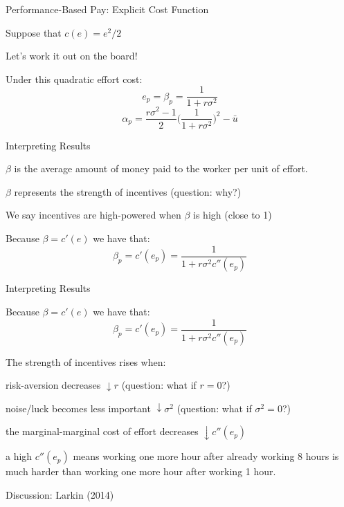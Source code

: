 \documentclass[aspectratio=169,usenames,dvipsnames]{beamer}
\newenvironment{wideitemize}{\itemize\addtolength{\itemsep}{10pt}}{\enditemize}
\begin{document}
\begin{frame}{Performance-Based Pay: Explicit Cost Function}
    \begin{wideitemize}
        \item Suppose that $c(e)=e^2/2$
        \item Let's work it out on the board!
        \pause
        \item Under this quadratic effort cost:
        \[e_p =\beta_p = \frac{1}{1+r \sigma^2}  \]
        \[\alpha_p =  \frac{r \sigma^2-1}{2} \bigg ( \frac{1}{1+r \sigma^2} \bigg )^2-\bar u \]
    \end{wideitemize}
\end{frame}

\begin{frame}{Interpreting Results}
    \begin{wideitemize}
        \item $\beta$ is the average amount of money paid to the worker per unit of effort.
        \item $\beta$ represents the strength of incentives (question: why?)
        \item We say incentives are high-powered when $\beta$ is high (close to 1)
        \item Because $\beta=c'(e)$ we have that:
        \[\beta_p =c'(e_{p})= \frac{1}{1+r \sigma^2 c''(e_{p})}\]
    \end{wideitemize}
\end{frame}
\begin{frame}{Interpreting Results}
    \begin{wideitemize}
        \item Because $\beta=c'(e)$ we have that:
        \[\beta_p =c'(e_{p})= \frac{1}{1+r \sigma^2 c''(e_{p})}\]
        \item The strength of incentives rises when:
        \begin{wideitemize}
            \item risk-aversion decreases $\downarrow r$ (question: what if $r=0$?)
            \item noise/luck becomes less important $\downarrow \sigma^2$ (question: what if $\sigma^2=0$?)
            \item the marginal-marginal cost of effort decreases $\downarrow c''(e_p)$
            \begin{wideitemize}
                \item a high $c''(e_p)$ means working one more hour after already working 8 hours is much harder than working one more hour after working 1 hour.
            \end{wideitemize}
        \end{wideitemize}
    \end{wideitemize}
\end{frame}


\begin{frame}
\centering
    \huge Discussion: Larkin (2014)
\end{frame}
\end{document}
